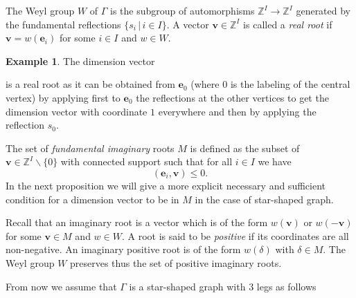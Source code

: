 \documentclass[11pt]{article}
\theoremstyle{definition}
\newtheorem{exam}[theo]{Example}
\numberwithin{equation}{section}
\newcommand{\bv}{{\mathbf{v}}}
\newcommand{\be}{{\mathbf{e}}}
\newcommand{\Z}{{\mathbb{Z}}}
\begin{document}
The Weyl group $W$ of $\Gamma$ is the subgroup of automorphisms $\Z^I\rightarrow\Z^I$ generated by the fundamental reflections $\{s_i\,|\, i\in I\}$. A vector $\bv\in\Z^I$ is called a \emph{real root} if $\bv=w(\be_i)$ for some $i\in I$ and $w\in W$.



\begin{exam}The dimension vector 
	{\footnotesize{
			\begin{center}
	\end{center}}}
	\noindent is a real root as it can be obtained from  $\be_0$ (where $0$ is the labeling of the central vertex) by applying first to $\be_0$ the reflections at the other vertices to get the dimension vector with coordinate $1$ everywhere and then by applying the reflection $s_0$.
	
\end{exam}





The set of \emph{fundamental imaginary} roots $M$ is defined as the subset of $\bv\in\Z^I\backslash\{0\}$ with connected support such that for all $i\in I$ we have
$$
(\be_i,\bv)\leq 0.
$$
In the next proposition we will give a more explicit necessary and sufficient condition for a dimension vector to be in $M$ in the case of star-shaped graph.



Recall that an imaginary root is a vector which is of the form $w(\bv)$ or $w(-\bv)$ for some $\bv\in M$ and $w\in W$. A root is said to be \emph{positive} if its coordinates are all non-negative. An imaginary positive root is of the form $w(\delta)$ with $\delta\in M$. The Weyl group $W$ preserves thus the set of positive imaginary roots.


From now we assume that $\Gamma$ is a star-shaped graph with $3$ legs as follows 
\end{document}
